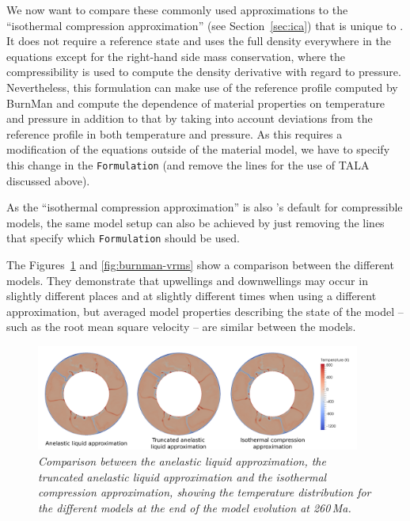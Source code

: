 We now want to compare these commonly used approximations to the ``isothermal compression approximation''
(see Section~\ref{sec:ica}) that is unique to \aspect{}. It does not require a reference state and uses
the full density everywhere in the equations except for the right-hand side  mass conservation, where the
compressibility is used to compute the density derivative with regard to pressure.
Nevertheless, this formulation can make use of the reference profile computed by BurnMan and compute the
dependence of material properties on temperature and pressure in addition to that by taking into account
deviations from the reference profile in both temperature and pressure. As this requires a modification
of the equations outside of the material model, we have to specify this change in the
\texttt{Formulation} (and remove the lines for the use of TALA discussed above).

As the ``isothermal compression approximation'' is also \aspect{}'s default for compressible models,
the same model setup can also be achieved by just removing the lines that specify which \texttt{Formulation}
should be used.

The Figures~\ref{fig:burnman-comparison} and \ref{fig:burnman-vrms} show a comparison between the different
models. They demonstrate that upwellings and downwellings may occur in slightly different places and at
slightly different times when using a different approximation, but averaged model properties describing
the state of the model -- such as the root mean square velocity -- are similar between the models.

\begin{figure}
\centering
  \includegraphics[width=0.95\textwidth]{cookbooks/burnman/doc/comparison.pdf}
  \caption{\it Comparison between the anelastic liquid approximation,
               the truncated anelastic liquid approximation
               and the isothermal compression approximation,
               showing the temperature distribution for the different models at
               the end of the model evolution at 260\,Ma.}
  \label{fig:burnman-comparison}
\end{figure}

